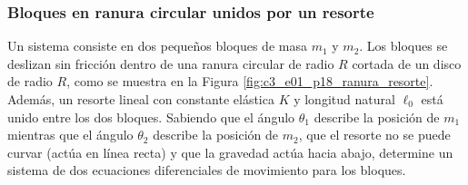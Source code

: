 \subsubsection{Bloques en ranura circular unidos por un resorte}

Un sistema consiste en dos pequeños bloques de masa $m_1$ y $m_2$. Los bloques se deslizan sin fricción dentro de una ranura circular de radio $R$ cortada de un disco de radio $R$, como se muestra en la Figura \ref{fig:c3_e01_p18_ranura_resorte}. Además, un resorte lineal con constante elástica $K$ y longitud natural $\ell_0$ está unido entre los dos bloques. Sabiendo que el ángulo $\theta_1$ describe la posición de $m_1$ mientras que el ángulo $\theta_2$ describe la posición de $m_2$, que el resorte no se puede curvar (actúa en línea recta) y que la gravedad actúa hacia abajo, determine un sistema de dos ecuaciones diferenciales de movimiento para los bloques.

